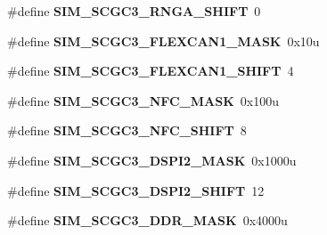 \begin{DoxyCompactItemize}
\item 
\hypertarget{group___s_i_m___register___masks_ga998019751f05a8b543f2caf3f05fad17}{}\#define {\bfseries S\+I\+M\+\_\+\+S\+C\+G\+C3\+\_\+\+R\+N\+G\+A\+\_\+\+S\+H\+I\+F\+T}~0\label{group___s_i_m___register___masks_ga998019751f05a8b543f2caf3f05fad17}

\item 
\hypertarget{group___s_i_m___register___masks_gad5ca1accf676cd89deb375ba851828cc}{}\#define {\bfseries S\+I\+M\+\_\+\+S\+C\+G\+C3\+\_\+\+F\+L\+E\+X\+C\+A\+N1\+\_\+\+M\+A\+S\+K}~0x10u\label{group___s_i_m___register___masks_gad5ca1accf676cd89deb375ba851828cc}

\item 
\hypertarget{group___s_i_m___register___masks_ga26dc7ff908234ceb8daca5451e281399}{}\#define {\bfseries S\+I\+M\+\_\+\+S\+C\+G\+C3\+\_\+\+F\+L\+E\+X\+C\+A\+N1\+\_\+\+S\+H\+I\+F\+T}~4\label{group___s_i_m___register___masks_ga26dc7ff908234ceb8daca5451e281399}

\item 
\hypertarget{group___s_i_m___register___masks_gac9da37de04a09e8a099e1674bb1005e0}{}\#define {\bfseries S\+I\+M\+\_\+\+S\+C\+G\+C3\+\_\+\+N\+F\+C\+\_\+\+M\+A\+S\+K}~0x100u\label{group___s_i_m___register___masks_gac9da37de04a09e8a099e1674bb1005e0}

\item 
\hypertarget{group___s_i_m___register___masks_ga001dccdbe55941508fde639217ff608f}{}\#define {\bfseries S\+I\+M\+\_\+\+S\+C\+G\+C3\+\_\+\+N\+F\+C\+\_\+\+S\+H\+I\+F\+T}~8\label{group___s_i_m___register___masks_ga001dccdbe55941508fde639217ff608f}

\item 
\hypertarget{group___s_i_m___register___masks_gacb8120d6caa2c4ddcaeb7600613cd826}{}\#define {\bfseries S\+I\+M\+\_\+\+S\+C\+G\+C3\+\_\+\+D\+S\+P\+I2\+\_\+\+M\+A\+S\+K}~0x1000u\label{group___s_i_m___register___masks_gacb8120d6caa2c4ddcaeb7600613cd826}

\item 
\hypertarget{group___s_i_m___register___masks_ga2c090f059bef49d2e66039cbd3fc4388}{}\#define {\bfseries S\+I\+M\+\_\+\+S\+C\+G\+C3\+\_\+\+D\+S\+P\+I2\+\_\+\+S\+H\+I\+F\+T}~12\label{group___s_i_m___register___masks_ga2c090f059bef49d2e66039cbd3fc4388}

\item 
\hypertarget{group___s_i_m___register___masks_ga79dba0f57b5fe46c64284f43f1d1e8dd}{}\#define {\bfseries S\+I\+M\+\_\+\+S\+C\+G\+C3\+\_\+\+D\+D\+R\+\_\+\+M\+A\+S\+K}~0x4000u\label{group___s_i_m___register___masks_ga79dba0f57b5fe46c64284f43f1d1e8dd}


\end{DoxyCompactItemize}
